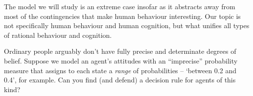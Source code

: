 The model we will study is an extreme case insofar as it abstracts away from
most of the contingencies that make human behaviour interesting. Our topic is
not specifically human behaviour and human cognition, but what unifies all types
of rational behaviour and cognition.

\begin{essay}
  Ordinary people arguably don't have fully precise and determinate degrees of
  belief. Suppose we model an agent's attitudes with an ``imprecise''
  probability measure that assigns to each state a \emph{range} of probabilities
  -- `between 0.2 and 0.4', for example. Can you find (and defend) a decision
  rule for agents of this kind?
\end{essay}



